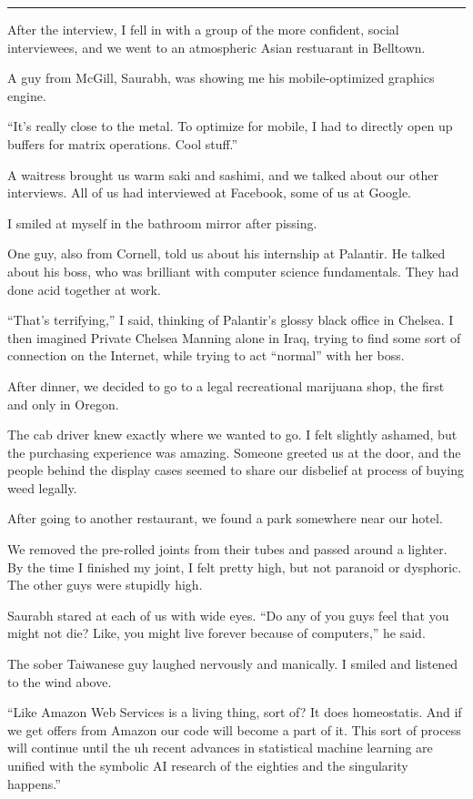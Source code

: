 \plainfancybreak{12pt}{2}{* * *}

After the interview, I fell in with a group of the more confident, social
interviewees, and we went to an atmospheric Asian restuarant in Belltown.

A guy from McGill, Saurabh, was showing me his mobile-optimized graphics engine.

``It's really close to the metal.  To optimize for mobile, I had to directly
open up buffers for matrix operations.  Cool stuff.''

A waitress brought us warm saki and sashimi, and we talked about our other
interviews.  All of us had interviewed at Facebook, some of us at Google.  

I smiled at myself in the bathroom mirror after pissing.

One guy, also from Cornell, told us about his internship at Palantir.  He talked
about his boss, who was brilliant with computer science fundamentals.  They had
done acid together at work.

``That's terrifying,'' I said, thinking of Palantir's glossy black office in
Chelsea.  I then imagined Private Chelsea Manning alone in Iraq, trying to find
some sort of connection on the Internet, while trying to act ``normal'' with her
boss.

After dinner, we decided to go to a legal recreational marijuana shop, the first
and only in Oregon.

The cab driver knew exactly where we wanted to go.  I felt slightly ashamed, but
the purchasing experience was amazing.  Someone greeted us at the door, and the
people behind the display cases seemed to share our disbelief at process
of buying weed legally.

After going to another restaurant, we found a park somewhere near our hotel.

We removed the pre-rolled joints from their tubes and passed around a lighter.
By the time I finished my joint, I felt pretty high, but not paranoid or
dysphoric.  The other guys were stupidly high.

Saurabh stared at each of us with wide eyes.  ``Do any of you guys feel that you
might not die?  Like, you might live forever because of computers,'' he said.

The sober Taiwanese guy laughed nervously and manically.  I smiled and listened
to the wind above.

``Like Amazon Web Services is a living thing, sort of?  It does homeostatis.
And if we get offers from Amazon our code will become a part of it.  This sort
of process will continue until the uh recent advances in statistical machine
learning are unified with the symbolic AI research of the eighties and the
singularity happens.''

